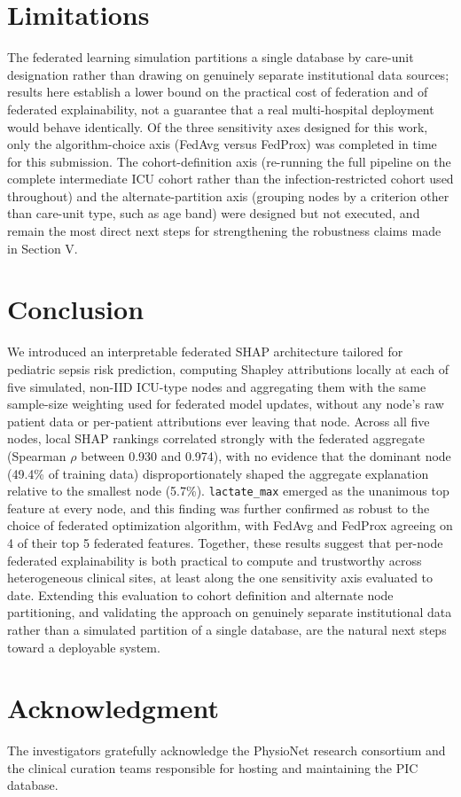 \documentclass[conference]{IEEEtran}
\begin{document}
\section{Limitations}

The federated learning simulation partitions a single database by care-unit
designation rather than drawing on genuinely separate institutional data
sources; results here establish a lower bound on the practical cost of
federation and of federated explainability, not a guarantee that a real
multi-hospital deployment would behave identically. Of the three sensitivity
axes designed for this work, only the algorithm-choice axis (FedAvg versus
FedProx) was completed in time for this submission. The cohort-definition
axis (re-running the full pipeline on the complete intermediate ICU cohort
rather than the infection-restricted cohort used throughout) and the
alternate-partition axis (grouping nodes by a criterion other than
care-unit type, such as age band) were designed but not executed, and
remain the most direct next steps for strengthening the robustness claims
made in Section V.

\section{Conclusion}

We introduced an interpretable federated SHAP architecture tailored for
pediatric sepsis risk prediction, computing Shapley attributions locally at
each of five simulated, non-IID ICU-type nodes and aggregating them with
the same sample-size weighting used for federated model updates, without
any node's raw patient data or per-patient attributions ever leaving that
node. Across all five nodes, local SHAP rankings correlated strongly with
the federated aggregate (Spearman $\rho$ between 0.930 and 0.974), with no
evidence that the dominant node (49.4\% of training data) disproportionately
shaped the aggregate explanation relative to the smallest node (5.7\%).
\texttt{lactate\_max} emerged as the unanimous top feature at every node,
and this finding was further confirmed as robust to the choice of
federated optimization algorithm, with FedAvg and FedProx agreeing on 4 of
their top 5 federated features. Together, these results suggest that
per-node federated explainability is both practical to compute and
trustworthy across heterogeneous clinical sites, at least along the one
sensitivity axis evaluated to date. Extending this evaluation to cohort
definition and alternate node partitioning, and validating the approach on
genuinely separate institutional data rather than a simulated partition of
a single database, are the natural next steps toward a deployable system.

\section*{Acknowledgment}
The investigators gratefully acknowledge the PhysioNet research consortium
and the clinical curation teams responsible for hosting and maintaining the
PIC database.



\end{document}
